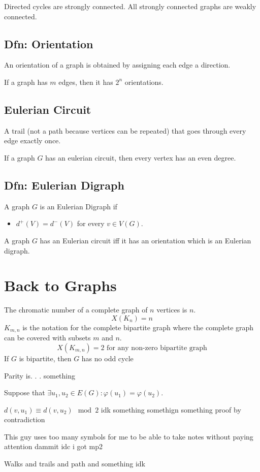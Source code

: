 \documentclass{report}
\begin{document}
Directed cycles are strongly connected. All strongly connected graphs are weakly connected.

\section{Dfn: Orientation}
An orientation of a graph is obtained by assigning each edge a direction.

If a graph has $m$ edges, then it has $2^n$ orientations.

\section{Eulerian Circuit}
A trail (not a path because vertices can be repeated) that goes through every edge exactly once. 

If a graph $G$ has an eulerian circuit, then every vertex has an even degree.

\section{Dfn: Eulerian Digraph}
A graph $G$ is an Eulerian Digraph if
\begin{itemize}
\item
$d^+(V) = d^-(V)$ for every $v \in V(G)$.
\end{itemize}

A graph $G$ has an Eulerian circuit iff it has an orientation which is an Eulerian digraph.


\chapter{Back to Graphs}
The chromatic number of a complete graph of $n$ vertices is $n$.
\[
X(K_n) = n
\]
$K_{m, n}$ is the notation for the complete bipartite graph where the complete graph can be covered with subsets $m$ and $n$.
\[
X(K_{m, n}) = 2 \textrm{ for any non-zero bipartite graph}
\]
If $G$ is bipartite, then $G$ has no odd cycle

Parity is. . . something

Suppose that $\exists u_1, u_2 \in E(G): \varphi(u_1) = \varphi(u_2)$.

$
d(v, u_1) \equiv d(v, u_2) \mod 2
$
idk something somethign something proof by contradiction

This guy uses too many symbols for me to be able to take notes without paying attention dammit idc i got mp2

Walks and trails and path and something idk
\end{document}
